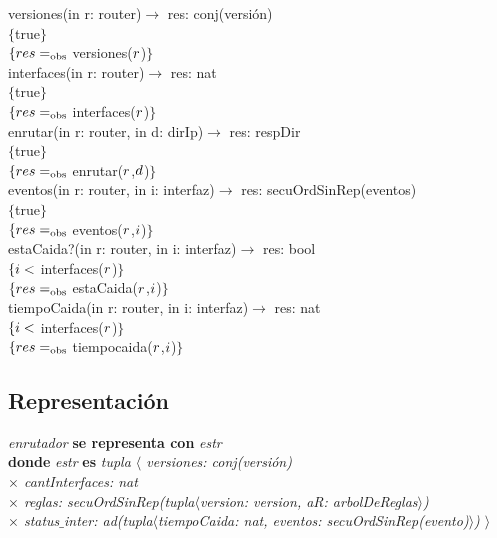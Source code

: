 versiones(in r: router)$\longrightarrow$ res: conj(versi\'on)\\
$\{$true$\}$\\
$\{{res}=_{\mathrm{obs}}$ versiones(${r}$)$\}$\\

interfaces(in r: router)$\longrightarrow$ res: nat\\
$\{$true$\}$\\
$\{{res} =_{\mathrm{obs}}$ interfaces(${r}$)$\}$\\

enrutar(in r: router, in d: dirIp)$\longrightarrow$ res: respDir\\
$\{$true$\}$\\
$\{{res} =_{\mathrm{obs}}$ enrutar(${r}$,${d}$)$\}$\\

eventos(in r: router, in i: interfaz)$\longrightarrow$ res: secuOrdSinRep(eventos)\\
$\{$true$\}$\\
$\{{res} =_{\mathrm{obs}}$ eventos(${r}$,${i}$)$\}$\\

estaCaida?(in r: router, in i: interfaz)$\longrightarrow$ res: bool\\
$\{{i} <$ interfaces(${r}$)$\}$\\
$\{{res} =_{\mathrm{obs}}$ estaCaida(${r}$,${i}$)$\}$\\

tiempoCaida(in r: router, in i: interfaz)$\longrightarrow$ res: nat\\
$\{{i} <$ interfaces(${r}$)$\}$\\
$\{{res} =_{\mathrm{obs}}$ tiempocaida(${r}$,${i}$)$\}$\\


\subsection*{Representaci\'on}
\textit{enrutador} \textbf{se representa con} \textit{estr}\\
\textbf{donde} \textit{estr} \textbf{es} \textit{tupla $\langle$ versiones: conj(versi\'on)\\
\hspace*{3.5cm} $\times$  cantInterfaces: nat\\
\hspace*{3.5cm} $\times$  reglas: secuOrdSinRep(tupla$\langle$version: version, aR: arbolDeReglas$\rangle$)\\ %
\hspace*{3.5cm} $\times$  status$\_$inter: ad(tupla$\langle$tiempoCaida: nat, eventos: secuOrdSinRep(evento)$\rangle$) $\rangle$}
\vspace{33pt}

